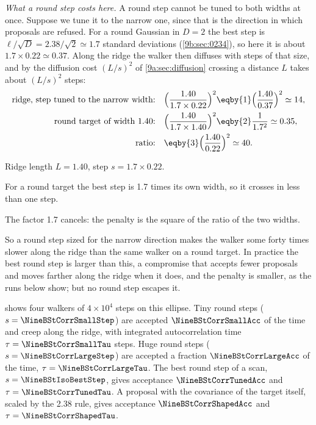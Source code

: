 \emph{What a round step costs here.} A round step cannot be tuned to both widths at once.
Suppose we tune it to the narrow one, since that is the direction in which proposals are refused.
For a round Gaussian in $D=2$ the best step is $\ell/\sqrt D=2.38/\sqrt2\simeq1.7$ standard
deviations (\cref{9b:sec:0234}), so here it is about $1.7\times0.22\simeq0.37$. Along the ridge
the walker then diffuses with steps of that size, and by the diffusion cost $(L/s)^2$ of
\cref{9a:sec:diffusion} crossing a distance $L$ takes about $(L/s)^2$ steps:
\begin{align*}
  \text{ridge, step tuned to the narrow width:}\quad
  &\Bigl(\frac{1.40}{1.7\times0.22}\Bigr)^2\eqby{1}\Bigl(\frac{1.40}{0.37}\Bigr)^2\simeq14,
  \\
  \text{round target of width 1.40:}\quad
  &\Bigl(\frac{1.40}{1.7\times1.40}\Bigr)^2\eqby{2}\frac1{1.7^2}\simeq0.35,
  \\
  \text{ratio:}\quad
  &\eqby{3}\Bigl(\frac{1.40}{0.22}\Bigr)^2\simeq40 .
\end{align*}
\begin{explain}
  \item Ridge length $L=1.40$, step $s=1.7\times0.22$.
  \item For a round target the best step is 1.7 times its own width, so it crosses in less than
        one step.
  \item The factor 1.7 cancels: the penalty is the square of the ratio of the two widths.
\end{explain}
So a round step sized for the narrow direction makes the walker some forty times slower along the
ridge than the same walker on a round target. In practice the best round step is larger than
this, a compromise that accepts fewer proposals and moves farther along the ridge when it does,
and the penalty is smaller, as the runs below show; but no round step escapes it.

 shows four walkers of $4\times10^4$ steps on this ellipse. Tiny
round steps ($s=\NineBStCorrSmallStep$) are accepted $\NineBStCorrSmallAcc$ of the time and creep
along the ridge, with integrated autocorrelation time $\tau=\NineBStCorrSmallTau$ steps. Huge
round steps ($s=\NineBStCorrLargeStep$) are accepted a fraction $\NineBStCorrLargeAcc$ of the
time, $\tau=\NineBStCorrLargeTau$. The best round step of a scan, $s=\NineBStIsoBestStep$, gives
acceptance $\NineBStCorrTunedAcc$ and $\tau=\NineBStCorrTunedTau$. A proposal with the
covariance of the target itself, scaled by the 2.38 rule, gives acceptance
$\NineBStCorrShapedAcc$ and $\tau=\NineBStCorrShapedTau$.

